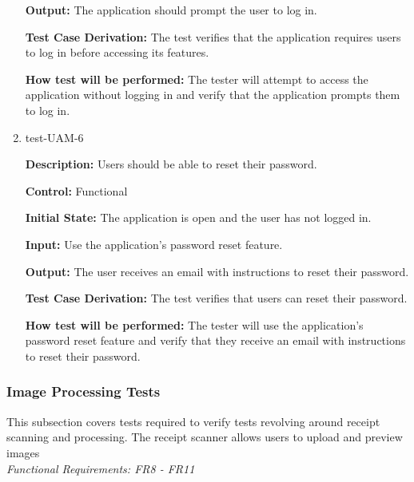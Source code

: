 \documentclass[12pt, titlepage]{article}
\begin{document}
\begin{enumerate}
\textbf{Output:} The application should prompt the user to log in.

\textbf{Test Case Derivation:} The test verifies that the application requires
users to log in before accessing its features.

\textbf{How test will be performed:} The tester will attempt to access the
application without logging in and verify that the application prompts them to log
in.

\item{test-UAM-6}

\textbf{Description:} Users should be able to reset their password.

\textbf{Control:} Functional

\textbf{Initial State:} The application is open and the user has not logged in.

\textbf{Input:} Use the application's password reset feature.

\textbf{Output:} The user receives an email with instructions to reset their password.

\textbf{Test Case Derivation:} The test verifies that users can reset their
password.

\textbf{How test will be performed:} The tester will use the application's
password reset feature and verify that they receive an email with instructions
to reset their password.

\end{enumerate}

\subsubsection{Image Processing Tests}

This subsection covers tests required to verify tests revolving around receipt scanning and processing. The receipt scanner allows users to upload and preview images\\
\textit{Functional Requirements: FR8 - FR11}
\end{document}
